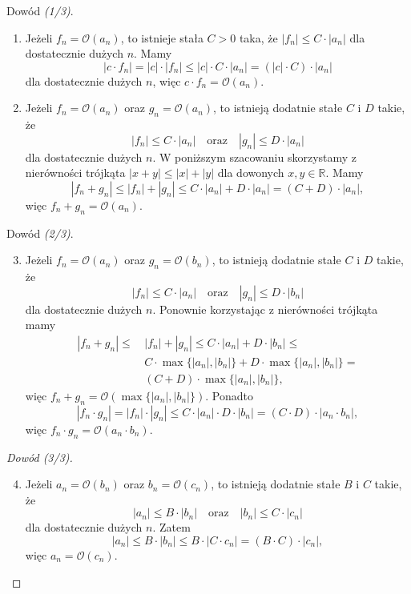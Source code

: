 \documentclass[a4paper,10pt]{beamer}
\begin{document}
\begin{frame}
\begin{block}{Dowód {\it(1/3)}.}
\begin{enumerate}
\item Jeżeli $f_n=\mathcal{O}(a_n)$, to istnieje stała $C>0$ taka, że $|f_n|\leqslant C\cdot|a_n|$ dla dostatecznie dużych $n$. Mamy
$$|c\cdot f_n|=|c|\cdot|f_n|\leqslant|c|\cdot C\cdot |a_n|=(|c|\cdot C)\cdot|a_n|$$ dla dostatecznie dużych $n$, więc $c\cdot f_n=\mathcal{O}(a_n)$.
\item Jeżeli $f_n=\mathcal{O}(a_n)$ oraz $g_n=\mathcal{O}(a_n)$, to istnieją dodatnie stałe $C$ i $D$ takie, że
$$|f_n|\leqslant C\cdot|a_n|\ \ \ \mbox{ oraz }\ \ \ |g_n|\leqslant D\cdot |a_n|$$ dla dostatecznie dużych $n$. W poniższym szacowaniu skorzystamy z nierówności trójkąta $|x+y|\leqslant|x|+|y|$ dla dowonych $x,y\in\mathbb{R}$. Mamy
$$|f_n+g_n|\leqslant|f_n|+|g_n|\leqslant C\cdot|a_n|+D\cdot|a_n|=(C+D)\cdot|a_n|,$$
więc $f_n+g_n=\mathcal{O}(a_n)$.
\end{enumerate}
\end{block}
\end{frame}



\begin{frame}
\begin{block}{Dowód {\it(2/3)}.}
\begin{enumerate}
  \setcounter{enumi}{2}
\item Jeżeli $f_n=\mathcal{O}(a_n)$ oraz $g_n=\mathcal{O}(b_n)$, to istnieją dodatnie stałe $C$ i $D$ takie, że
$$|f_n|\leqslant C\cdot|a_n|\ \ \ \mbox{ oraz }\ \ \ |g_n|\leqslant D\cdot |b_n|$$ dla dostatecznie dużych $n$. Ponownie korzystając z nierówności trójkąta mamy 
\begin{align*}
|f_n+g_n|\leqslant&\,|f_n|+|g_n|\leqslant C\cdot|a_n|+D\cdot|b_n|\leqslant\\
&\,C\cdot\max\{|a_n|,|b_n|\}+D\cdot\max\{|a_n|,|b_n|\}=\\
&\,(C+D)\cdot\max\{|a_n|,|b_n|\},
\end{align*}
więc $f_n+g_n=\mathcal{O}(\max\{|a_n|,|b_n|\})$. Ponadto
$$|f_n\cdot g_n|=|f_n|\cdot|g_n|\leqslant C\cdot|a_n|\cdot D\cdot|b_n|=(C\cdot D)\cdot|a_n\cdot b_n|,$$
więc $f_n\cdot g_n=\mathcal{O}(a_n\cdot b_n)$.
\end{enumerate}
\end{block}
\end{frame}



\begin{frame}
\begin{proof}[Dowód {\it(3/3)}]
\begin{enumerate}
  \setcounter{enumi}{3}
\item Jeżeli $a_n=\mathcal{O}(b_n)$ oraz $b_n=\mathcal{O}(c_n)$, to istnieją dodatnie stałe $B$ i $C$ takie, że
$$|a_n|\leqslant B\cdot|b_n|\ \ \ \mbox{ oraz }\ \ \ |b_n|\leqslant C\cdot |c_n|$$ dla dostatecznie dużych $n$. Zatem
$$|a_n|\leqslant B\cdot |b_n|\leqslant B\cdot |C\cdot c_n|=(B\cdot C)\cdot|c_n|,$$
więc $a_n=\mathcal{O}(c_n)$.
\end{enumerate}
\end{proof}
\end{frame}
\end{document}
